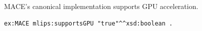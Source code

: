 MACE's canonical implementation supports GPU acceleration.
\begin{lstlisting}[language=turtle]
ex:MACE mlips:supportsGPU "true"^^xsd:boolean .
\end{lstlisting}
